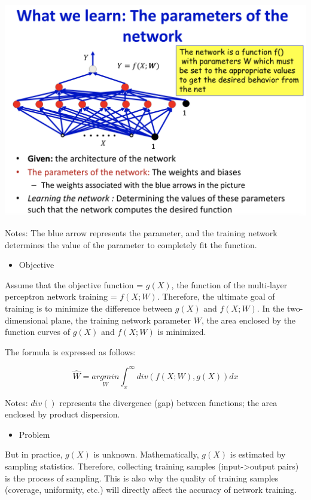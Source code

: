 \documentclass{article}
\begin{document}
	\includegraphics[scale=0.2]{43.png}
	
	Notes: The blue arrow represents the parameter, and the training network determines the value of the parameter to completely fit the function.
	
	
	\begin{itemize}
		\item Objective
	\end{itemize}
	
	Assume that the objective function = $g(X)$, the function of the multi-layer perceptron network training = $f(X;W)$. Therefore, the ultimate goal of training is to minimize the difference between $g(X)$ and $f(X;W)$. In the two-dimensional plane, the training network parameter $W$, the area enclosed by the function curves of $g(X)$ and $f(X;W)$ is minimized. 
	
	The formula is expressed as follows:
	
	$$\hat{W}=\underset{W}{argmin}\int_{x}^{\infty }div(f(X;W),g(X))dx$$
	
	Notes: $div()$ represents the divergence (gap) between functions; the area enclosed by product dispersion.
	
	
	\begin{itemize}
		\item Problem
	\end{itemize}
	
	But in practice, $g(X)$ is unknown. Mathematically, $g(X)$ is estimated by sampling statistics. Therefore, collecting training samples (input->output pairs) is the process of sampling. This is also why the quality of training samples (coverage, uniformity, etc.) will directly affect the accuracy of network training.
	
\end{document}

